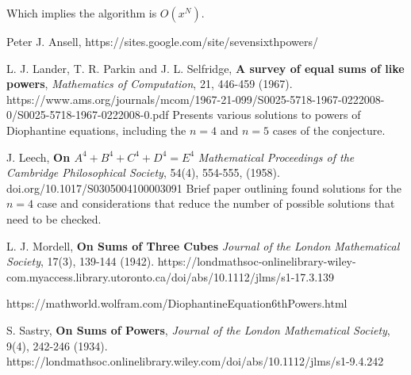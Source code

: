 \documentclass{article}
\begin{document}
\begin{flushleft}
Which implies the algorithm is $O(x^N)$.




\begin{thebibliography}{9}

Peter J. Ansell, https://sites.google.com/site/sevensixthpowers/

L. J. Lander, T. R. Parkin and J. L. Selfridge,
       {\bf A survey of equal sums of like powers}, 
        \textit{Mathematics of Computation}, 21, 446-459 (1967). 
        https://www.ams.org/journals/mcom/1967-21-099/S0025-5718-1967-0222008-0/S0025-5718-1967-0222008-0.pdf 
        \subitem Presents various solutions to powers of Diophantine equations, including the $n=4$ and $n=5$ cases of the conjecture. 

J. Leech, {\bf On $A^4 + B^4 + C^4 + D^4 = E^4$}
    \textit{Mathematical Proceedings of the Cambridge Philosophical Society}, 54(4), 554-555, (1958).
        doi.org/10.1017/S0305004100003091
        \subitem Brief paper outlining found solutions for the $n=4$ case and considerations that reduce the number of possible solutions that need to be checked.

L. J. Mordell, {\bf On Sums of Three Cubes}
\textit{Journal of the London Mathematical Society}, 17(3), 139-144 (1942). 
https://londmathsoc-onlinelibrary-wiley-com.myaccess.library.utoronto.ca/doi/abs/10.1112/jlms/s1-17.3.139


https://mathworld.wolfram.com/DiophantineEquation6thPowers.html

S. Sastry, 
{\bf On Sums of Powers}, 
\textit{Journal of the London Mathematical Society}, 9(4), 242-246 (1934). 
https://londmathsoc.onlinelibrary.wiley.com/doi/abs/10.1112/jlms/s1-9.4.242

\end{thebibliography}

\end{flushleft}
\end{document}
